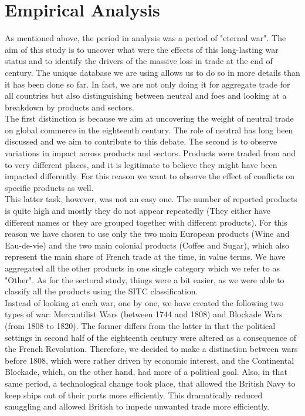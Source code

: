 \documentclass[12pt,a4paper,notitlepage,english]{article}
\begin{document}
\section{Empirical Analysis}
As mentioned above, the period in analysis was a period of "eternal war". The aim of this study is to uncover what were the effects of this long-lasting war status and to identify the drivers of the massive loss in trade at the end of century. The unique database we are using allows us to do so in more details than it has been done so far. In fact, we are not only doing it for aggregate trade for all countries but also distinguishing between neutral and foes and looking at a breakdown by products and sectors. \\
The first distinction is because we aim at uncovering the weight of neutral trade on global commerce in the eighteenth century. The role of neutral has long been discussed and we aim to contribute to this debate. The second is to observe variations in impact across products and sectors. Products were traded from and to very different places, and it is legitimate to believe they might have been impacted differently. For this reason we want to observe the effect of conflicts on specific products as well. \\
This latter task, however, was not an easy one. The number of reported products is quite high and mostly they do not appear repeatedly (They either have different names or they are grouped together with different products). For this reason we have chosen to use only the two main European products (Wine and Eau-de-vie) and the two main colonial products (Coffee and Sugar), which also represent the main share of French trade at the time, in value terms. We have aggregated all the other products in one single category which we refer to as "Other". As for the sectoral study, things were a bit easier, as we were able to classify all the products using the SITC classification. \\
Instead of looking at each war, one by one, we have created the following two types of war: Mercantilist Wars (between 1744 and 1808) and Blockade Wars (from 1808 to 1820). The former differs from the latter in that the political settings in second half of the eighteenth century were altered as a consequence of the French Revolution. Therefore, we decided to make a distinction between wars before 1808, which were rather driven by economic interest, and the Continental Blockade, which, on the other hand, had more of a political goal. Also, in that same period, a technological change took place, that allowed the British Navy to keep ships out of their ports more efficiently. This dramatically reduced smuggling and allowed British to impede unwanted trade more efficiently. 
\end{document}
